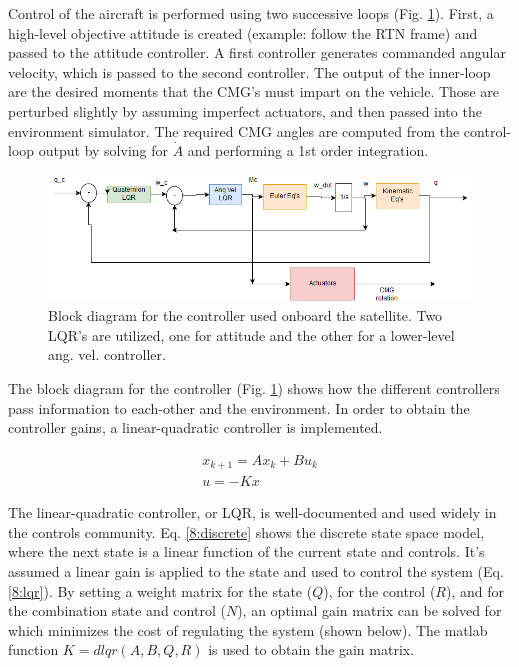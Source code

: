 \documentclass[12pt, letterpaper]{article}
\begin{document}
Control of the aircraft is performed using two successive loops (Fig. \ref{8:controller}). First, a high-level objective attitude is created (example: follow the RTN frame) and passed to the attitude controller. A first controller generates commanded angular velocity, which is passed to the second controller. The output of the inner-loop are the desired moments that the CMG's must impart on the vehicle. Those are perturbed slightly by assuming imperfect actuators, and then passed into the environment simulator. The required CMG angles are computed from the control-loop output by solving for $\dot{A}$ and performing a 1st order integration.


\begin{figure}[H]
	\centering
	\includegraphics[scale=0.7]{PS8_controller}
	\caption{Block diagram for the controller used onboard the satellite. Two LQR's are utilized, one for attitude and the other for a lower-level ang. vel. controller.}
	\label{8:controller}
\end{figure}

The block diagram for the controller (Fig. \ref{8:controller}) shows how the different controllers pass information to each-other and the environment. In order to obtain the controller gains, a linear-quadratic controller is implemented.

\begin{gather}
x_{k+1}=Ax_k+Bu_k
\label{8:discrete} \\ 
u=-Kx
\label{8:lqr}
\end{gather}

The linear-quadratic controller, or LQR, is well-documented and used widely in the controls community. Eq. \ref{8:discrete} shows the discrete state space model, where the next state is a linear function of the current state and controls. It's assumed a linear gain is applied to the state and used to control the system (Eq. \ref{8:lqr}). By setting a weight matrix for the state ($Q$), for the control ($R$), and for the combination state and control ($N$), an optimal gain matrix can be solved for which minimizes the cost of regulating the system (shown below). The matlab function $K=dlqr(A,B,Q,R)$ is used to obtain the gain matrix.
\end{document}
